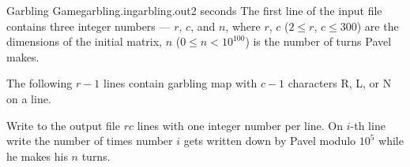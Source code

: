 \begin{problem}{Garbling Game}{garbling.in}{garbling.out}{2 seconds}
The first line of the input file contains three integer numbers --- $r$, $c$, and $n$, where
$r$, $c$ ($2 \le r$, $c \le 300$) are the dimensions of the initial matrix,
$n$ ($0 \le n < 10^{100}$) is the number of turns Pavel makes.

The following $r-1$ lines contain garbling map with $c-1$ characters R, L, or N on a line.

\OutputFile

Write to the output file $rc$ lines with one integer number per line. On $i$-th line write
the number of times number $i$ gets written down by Pavel modulo $10^5$ while he makes his $n$ turns.

\Example

\begin{example}
%
%
\end{example}

\end{problem}
